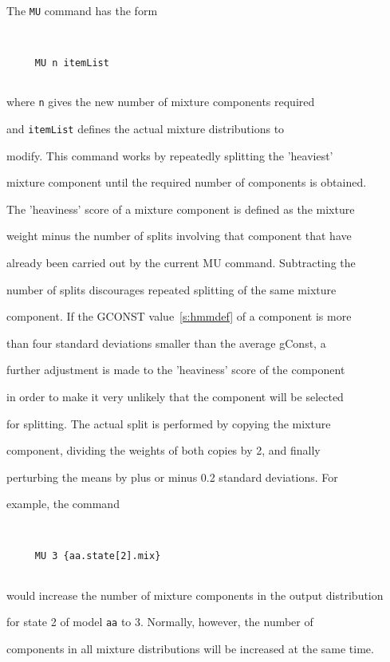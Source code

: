 The \texttt{MU} command has the form


\begin{verbatim}


     MU n itemList


\end{verbatim}


where \texttt{n} gives the new number of mixture components required


and \texttt{itemList} defines the actual mixture distributions to


modify.  This command works by repeatedly splitting the 'heaviest'


mixture component until the required number of components is obtained.


The 'heaviness' score of a mixture component is defined as the mixture


weight minus the number of splits involving that component that have


already been carried out by the current MU command. Subtracting the


number of splits discourages repeated splitting of the same mixture


component. If the GCONST value~\ref{s:hmmdef} of a component is more


than four standard deviations smaller than the average gConst, a


further adjustment is made to the 'heaviness' score of the component


in order to make it very unlikely that the component will be selected


for splitting. The actual split is performed by copying the mixture


component, dividing the weights of both copies by 2, and finally


perturbing the means by plus or minus 0.2 standard deviations.  For


example, the command


\begin{verbatim}


     MU 3 {aa.state[2].mix}


\end{verbatim}


would increase the number of mixture components in the output distribution


for state 2 of model \texttt{aa} to 3.   Normally, however,  the number of


components in all mixture distributions will be increased at the same time.


